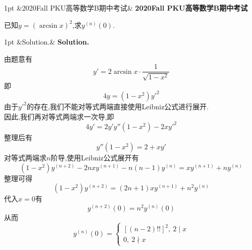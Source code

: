 \documentclass{ctexart}
\newenvironment{solution}[1][]{%
\def\FrameCommand{%
\hspace{1pt}%
{\color{solutionline}\vrule width 2pt}%
{\color{solutionshade}\vrule width 4pt}%
\colorbox{solutionshade}%
}%
\MakeFramed{\advance\hsize-\width\FrameRestore}%
\noindent\hspace{-4.55pt}%
\begin{adjustwidth}{}{1pt}%
\setlength{\parindent}{0pt}%
\vspace{3pt}%
\ifx&#1&\else %
    \textbf{#1}\par\vspace{1pt}%
\fi
}
{%
\vspace{2pt}%
\end{adjustwidth}\endMakeFramed%
}
\newenvironment{problem}[1][]{%
\def\FrameCommand{%
\hspace{1pt}%
{\color{problemline}\vrule width 2pt}%
{\color{problemshade}\vrule width 4pt}%
\colorbox{problemshade}%
}%
\MakeFramed{\advance\hsize-\width\FrameRestore}%
\noindent\hspace{-4.55pt}%
\begin{adjustwidth}{}{1pt}%
\setlength{\parindent}{0pt}%
\vspace{3pt}%
\ifx&#1&\else %
    \textbf{#1}\par\vspace{1pt}%
\fi
}
{%
\vspace{2pt}%
\end{adjustwidth}\endMakeFramed%
}
\begin{document}
\pagestyle{empty}
\begin{problem}[2020Fall PKU高等数学B期中考试]
    已知$\displaystyle y=(\arcsin x)^2$,求$y^{(n)}(0)$.
\end{problem}
\begin{solution}[Solution.]
    由题意有$$y'=2\arcsin x\cdot\dfrac{1}{\sqrt{1-x^2}}$$
    即$$4y=(1-x^2){y'^2}$$
    由于$y'^2$的存在,我们不能对等式两端直接使用Leibniz公式进行展开.\\
    因此,我们再对等式两端求一次导,即
    $$4y'=2y'y''(1-x^2)-2xy'^2$$
    整理后有$$y''(1-x^2)=2+xy'$$
    对等式两端求$n$阶导,使用Leibniz公式展开有
    $$(1-x^2)y^{(n+2)}-2nxy^{(n+1)}-n(n-1)y^{(n)}=xy^{(n+1)}+ny^{(n)}$$
    整理可得$$(1-x^2)y^{(n+2)}=(2n+1)xy^{(n+1)}+n^2y^{(n)}$$
    代入$x=0$有$$y^{(n+2)}(0)=n^2y^{(n)}(0)$$
    从而$$y^{(n)}(0)= \left\{\begin{array}{l} [(n-2)!!]^2,\ 2\mid x\\ 0,\ 2\nmid x\end{array}\right.$$
\end{solution}
\end{document}

